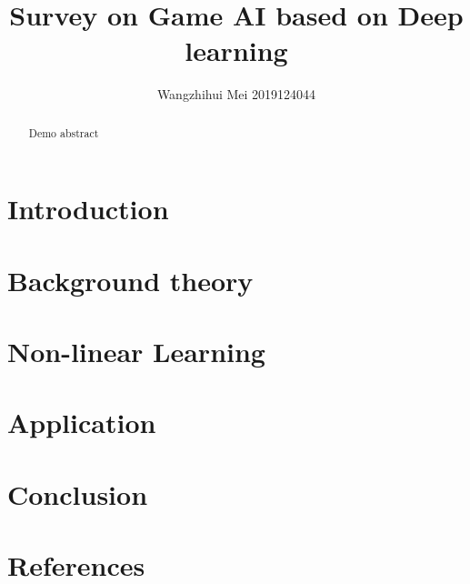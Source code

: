 \documentclass[11pt,en]{elegantpaper}
\title{Survey on Game AI based on Deep learning}
\author{Wangzhihui Mei 2019124044}
\institute{CCNU-UOW JI}
\date{}
\begin{document}
\maketitle

\begin{abstract}
	Demo abstract
\end{abstract}

\section{Introduction}

\section{Background theory}

\section{Non-linear Learning}

\section{Application}


\section{Conclusion}

\section{References}


\end{document}

